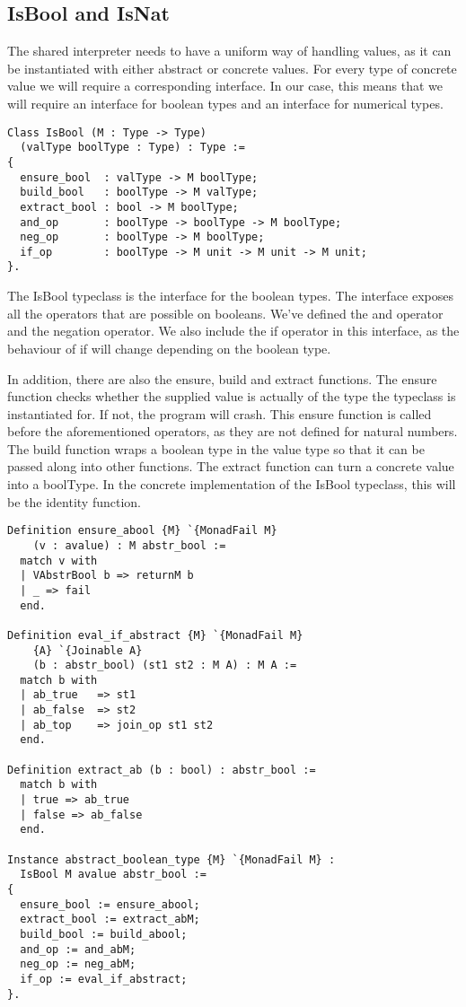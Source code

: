 \subsection{IsBool and IsNat}
The shared interpreter needs to have a uniform way of handling values, as it
can be instantiated with either abstract or concrete values. For every type of
concrete value we will require a corresponding interface. In our case, this
means that we will require an interface for boolean types and an interface for
numerical types.

\begin{verbatim}
Class IsBool (M : Type -> Type)
  (valType boolType : Type) : Type :=
{
  ensure_bool  : valType -> M boolType;
  build_bool   : boolType -> M valType;
  extract_bool : bool -> M boolType;
  and_op       : boolType -> boolType -> M boolType;
  neg_op       : boolType -> M boolType;
  if_op        : boolType -> M unit -> M unit -> M unit;
}.
\end{verbatim}

The IsBool typeclass is the interface for the boolean types. The interface
exposes all the operators that are possible on booleans. We've defined the and
operator and the negation operator. We also include the if operator in this
interface, as the behaviour of if will change depending on the boolean type. 

In addition, there are also the ensure, build and extract functions. The ensure
function checks whether the supplied value is actually of the type the
typeclass is instantiated for. If not, the program will crash. This ensure
function is called before the aforementioned operators, as they are not defined
for natural numbers. The build function wraps a boolean type in the value type
so that it can be passed along into other functions. The extract function can
turn a concrete value into a boolType. In the concrete implementation
of the IsBool typeclass, this will be the identity function.

\begin{verbatim}
Definition ensure_abool {M} `{MonadFail M} 
    (v : avalue) : M abstr_bool :=
  match v with
  | VAbstrBool b => returnM b
  | _ => fail
  end.

Definition eval_if_abstract {M} `{MonadFail M} 
    {A} `{Joinable A} 
    (b : abstr_bool) (st1 st2 : M A) : M A :=
  match b with
  | ab_true   => st1
  | ab_false  => st2
  | ab_top    => join_op st1 st2
  end.

Definition extract_ab (b : bool) : abstr_bool := 
  match b with
  | true => ab_true
  | false => ab_false
  end.

Instance abstract_boolean_type {M} `{MonadFail M} : 
  IsBool M avalue abstr_bool :=
{
  ensure_bool := ensure_abool;
  extract_bool := extract_abM;
  build_bool := build_abool;
  and_op := and_abM;
  neg_op := neg_abM;
  if_op := eval_if_abstract;
}.
\end{verbatim}

